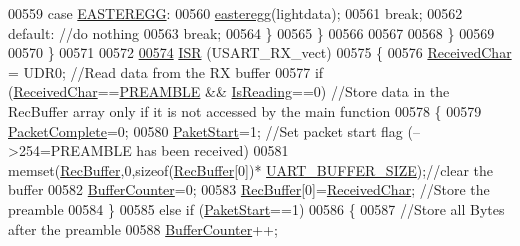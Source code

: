 \begin{DoxyCode}
{00559                 \textcolor{keywordflow}{case} \hyperlink{_led_effects_8h_a5645ec20d3cd39bfc1c9ad5ec99db2f2}{EASTEREGG}:
00560                     \hyperlink{_led_effects_8c_a25e09bcb1481b20ebc2a27e7098b5115}{easteregg}(lightdata);
00561                     \textcolor{keywordflow}{break};
00562                 \textcolor{keywordflow}{default}:    \textcolor{comment}{//do nothing}
00563                     \textcolor{keywordflow}{break};
00564             \}
00565         \}
00566         
00567         
00568     \}
00569       
00570 \}
00571 
00572 
\hypertarget{ws2811lichterkette_8c_source_l00574}{}\hyperlink{ws2811lichterkette_8c_a09ce999e15ad60b8a3f07d08af1946f9}{00574} \hyperlink{ws2811lichterkette_8c_a09ce999e15ad60b8a3f07d08af1946f9}{ISR} (USART\_RX\_vect)
00575 \{
00576     \hyperlink{globals_8h_ab5490074aaca289e986e9a00e0c25663}{ReceivedChar} = UDR0;                            \textcolor{comment}{//Read data from the RX buffer     }
00577     \textcolor{keywordflow}{if} (\hyperlink{globals_8h_ab5490074aaca289e986e9a00e0c25663}{ReceivedChar}==\hyperlink{ws2811lichterkette_8c_a8aac8c5098aaf915463fb31715efa09f}{PREAMBLE} && \hyperlink{globals_8h_a922ad5baed647eca43ad1a979e162ebd}{IsReading}==0)        \textcolor{comment}{//Store data in the
       RecBuffer array only if it is not accessed by the main function}
00578     \{
00579         \hyperlink{globals_8h_a1b09d1a5bcf4c8ab435bb3c9e36def59}{PacketComplete}=0;
00580         \hyperlink{globals_8h_aaa3bddd2273257ac5ec259197b62e984}{PaketStart}=1;                             \textcolor{comment}{//Set packet start flag (-->254=PREAMBLE has
       been received)}
00581         memset(\hyperlink{globals_8h_a5d735865707e6694a8173d629e0b4d5c}{RecBuffer},0,\textcolor{keyword}{sizeof}(\hyperlink{globals_8h_a5d735865707e6694a8173d629e0b4d5c}{RecBuffer}[0])*
      \hyperlink{globals_8h_a0d57378e32bf8278011460740bc29f7f}{UART\_BUFFER\_SIZE});\textcolor{comment}{//clear the buffer    }
00582         \hyperlink{globals_8h_aa6fcb4d4fca4554ac73bef10668c23cd}{BufferCounter}=0;
00583         \hyperlink{globals_8h_a5d735865707e6694a8173d629e0b4d5c}{RecBuffer}[0]=\hyperlink{globals_8h_ab5490074aaca289e986e9a00e0c25663}{ReceivedChar};                 \textcolor{comment}{//Store the preamble}
00584     \}
00585     \textcolor{keywordflow}{else} \textcolor{keywordflow}{if} (\hyperlink{globals_8h_aaa3bddd2273257ac5ec259197b62e984}{PaketStart}==1)
00586     \{
00587         \textcolor{comment}{//Store all Bytes after the preamble}
00588         \hyperlink{globals_8h_aa6fcb4d4fca4554ac73bef10668c23cd}{BufferCounter}++;    
}
\end{DoxyCode}
